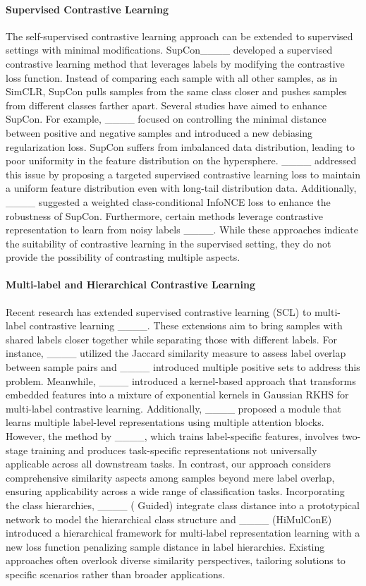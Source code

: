 \paragraph{Supervised Contrastive Learning}
The self-supervised contrastive learning approach can be extended to supervised settings with minimal modifications. SupCon____ developed a supervised contrastive learning method that leverages labels by modifying the contrastive loss function. Instead of comparing each sample with all other samples, as in SimCLR, SupCon pulls samples from the same class closer and pushes samples from different classes farther apart. Several studies have aimed to enhance SupCon. For example, ____ focused on controlling the minimal distance between positive and negative samples and introduced a new debiasing regularization loss. SupCon suffers from imbalanced data distribution, leading to poor uniformity in the feature distribution on the hypersphere. ____ addressed this issue by proposing a targeted supervised contrastive learning loss to maintain a uniform feature distribution even with long-tail distribution data. Additionally, ____ suggested a weighted class-conditional InfoNCE loss to enhance the robustness of SupCon. Furthermore, certain methods leverage contrastive representation to learn from noisy labels ____.  While these approaches indicate the suitability of contrastive learning in the supervised setting, they do not provide the possibility of contrasting multiple aspects.


\paragraph{Multi-label and Hierarchical Contrastive Learning}
Recent research has extended supervised contrastive learning (SCL) to multi-label contrastive learning ____. These extensions aim to bring samples with shared labels closer together while separating those with different labels. For instance, ____ utilized the Jaccard similarity measure to assess label overlap between sample pairs and ____ introduced multiple positive sets to address this problem. Meanwhile, ____ introduced a kernel-based approach that transforms embedded features into a mixture of exponential kernels in Gaussian RKHS for multi-label contrastive learning. Additionally, ____ proposed a module that learns multiple label-level representations using multiple attention blocks. However, the method by ____, which trains label-specific features, involves two-stage training and produces task-specific representations not universally applicable across all downstream tasks.  In contrast, our approach considers comprehensive similarity aspects among samples beyond mere label overlap, ensuring applicability across a wide range of classification tasks. Incorporating the class hierarchies, ____ (
Guided) integrate class distance into a prototypical network to model the hierarchical class structure and ____ (HiMulConE) introduced a hierarchical framework for multi-label representation learning with a new loss function penalizing sample distance in label hierarchies. Existing approaches often overlook diverse similarity perspectives, tailoring solutions to specific scenarios rather than broader applications.